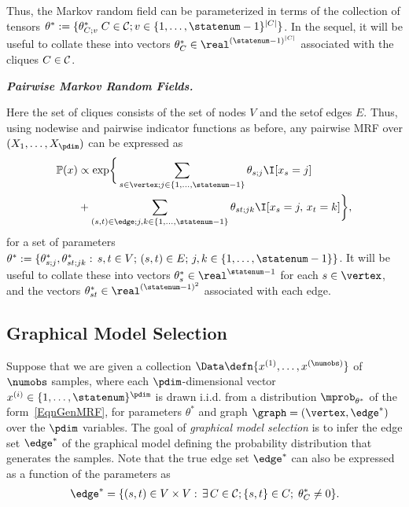 Thus, the Markov random field can be parameterized in terms of the collection of tensors $\theta^* := \{\theta^*_{\clique;v} \; \clique \in \CliqueSet; v \in \{1, \ldots, \statenum-1 \}^{|\clique|}\}$. In the sequel, it will be useful to collate these into vectors $\theta^*_{\clique} \in \real^{(\statenum-1)^{|\clique|}}$ associated with the cliques $C \in \mathcal{C}$. 

{\bf \emph{Pairwise Markov Random Fields.}}

Here the set of cliques consists of the set of nodes $V$ and the setof edges $E$. Thus,
using nodewise and pairwise indicator functions as before, any pairwise MRF over $(X_1, \ldots, X_\pdim)$
can be expressed as
\begin{align}
\label{EqnGenMRFPairwise}
\nonumber \mathbb{P}(x)  &\propto  \exp \biggr \{\sum_{s \in \vertex; j \in \{1, \ldots, \statenum-1 \}} \theta_{s;j}\I[x_s = j] 
	\\
& + \sum_{(s,t) \in \edge; j,k \in \{1, \ldots, \statenum-1 \}} \theta_{st;jk} \I[x_s = j,\,x_t = k] \biggr \},
\end{align}
for a set of parameters $\theta^* := \{\theta^*_{s;j}, \theta^*_{st;jk} :\, s,t \in V;\, (s,t) \in E;\, j,k \in \{1, \ldots, \statenum-1 \}\}$.
It will be useful to collate these into vectors $\theta^*_s \in \real^{\statenum-1}$ for each $s \in \vertex$, and the vectors $\theta^*_{st} \in \real^{(\statenum-1)^2}$ associated with each edge.

\subsection{Graphical Model Selection}

Suppose that we are given a collection $\Data \defn \{x^{(1)}, \ldots, x^{(\numobs)} \}$ of $\numobs$ samples, where each
$\pdim$-dimensional vector  $x^{(i)} \in \{1,\ldots,\statenum\}^\pdim$ is drawn i.i.d. from a distribution $\mprob_{\theta^*}$ of the
form~\eqref{EqnGenMRF}, for parameters $\theta^*$ and graph $\graph = (\vertex, \edge^*)$ over the $\pdim$ variables. 
The goal of \emph{graphical model selection} is to infer the edge set $\edge^*$ of the graphical model defining the probability distribution that generates the samples. Note that the true edge set $\edge^*$ can also be expressed as a function of the parameters as
\begin{eqnarray}
\label{EqnEdge}
\edge^* = \{(s,t) \in V \times V :\, \exists \, \clique \in \CliqueSet; \{s,t\} \in \clique;\; \theta^*_{\clique} \neq 0 \}.
\end{eqnarray}

